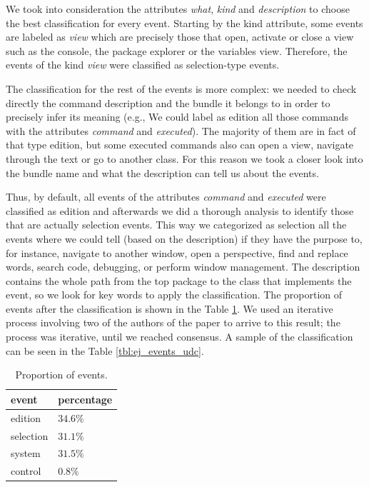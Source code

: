 \documentclass[times]{smrauth}
\begin{document}
We took into consideration the attributes \textit{what}, \textit{kind} and \textit{description} to choose the best classification for every event. Starting by the kind attribute, some events are labeled as \textit{view} which are precisely those that open, activate or close a view such as the console, the package explorer or the variables view. Therefore, the events of the kind \textit{view} were classified as selection-type events.

The classification for the rest of the events is more complex: we needed to check directly the command description and the bundle it belongs to in order to precisely infer its meaning (e.g., We could label as edition all those commands with the attributes \textit{command} and \textit{executed}). The majority of them are in fact of that type edition, but some executed commands also can open a view, navigate through the text or go to another class. For this reason we took a closer look into the bundle name and what the description can tell us about the events.

Thus, by default, all events of the attributes \textit{command} and \textit{executed} were classified as edition and afterwards we did a thorough analysis to identify those that are actually selection events.  This way we categorized as selection all the events where we could tell (based on the description) if they have the purpose to, for instance, navigate to another window, open a perspective, find and replace words, search code, debugging, or perform window management. The description contains the whole path from the top package to the class that implements the event, so we look for key words to apply the classification. The proportion of events after the classification is shown in the Table \ref{tbl:prop_events_udc}.
We used an iterative process involving two of the authors of the paper to arrive to this result; the process was iterative, until we reached consensus. A sample of the classification can be seen in the Table \ref{tbl:ej_events_udc}.

\begin{table}[ht!]
\tiny
\renewcommand{\arraystretch}{1.3}
\caption{Proportion of events. }
\label{tbl:prop_events_udc}
\centering
\begin{tabular}{|p{1.7cm}|p{2 cm}|} 
  \hline 
event & percentage \\  
  \hline 
    \hline 
edition &  $34.6\%$  \\
selection & $31.1\%$ \\
system & $31.5\%$  \\
control & $0.8\%$  \\
\hline
\end{tabular}
\end{table}
\end{document}

